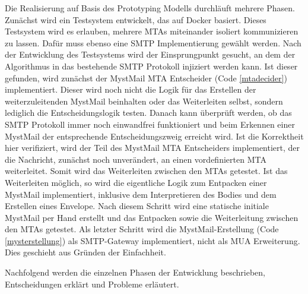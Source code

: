 Die Realisierung auf Basis des Prototyping Modells durchläuft mehrere Phasen. Zunächst wird ein Testsystem entwickelt, das auf Docker  basiert. Dieses Testsystem wird es erlauben, mehrere MTAs miteinander isoliert kommunizieren zu lassen. Dafür muss ebenso eine SMTP Implementierung gewählt werden. Nach der Entwicklung des Testsystems wird der Einsprungpunkt gesucht, an dem der Algorithmus in das bestehende SMTP Protokoll injiziert werden kann. Ist dieser gefunden, wird zunächst der MystMail MTA Entscheider (Code \ref{mtadecider}) implementiert. Dieser wird noch nicht die Logik für das Erstellen der weiterzuleitenden MystMail beinhalten oder das Weiterleiten selbst, sondern lediglich die Entscheidungslogik testen. Danach kann überprüft werden, ob das SMTP Protokoll immer noch einwandfrei funktioniert und beim Erkennen einer MystMail der entsprechende Entscheidungszweig erreicht wird. Ist die Korrektheit hier verifiziert, wird der Teil des MystMail MTA Entscheiders implementiert, der die Nachricht, zunächst noch unverändert, an einen vordefinierten MTA weiterleitet. Somit wird das Weiterleiten zwischen den MTAs getestet. Ist das Weiterleiten möglich, so wird die eigentliche Logik zum Entpacken einer MystMail implementiert, inklusive dem Interpretieren des Bodies und dem Erstellen eines Envelope. Nach diesem Schritt wird eine statische initiale MystMail per Hand erstellt und das Entpacken sowie die Weiterleitung zwischen den MTAs getestet. Als letzter Schritt wird die MystMail-Erstellung (Code \ref{mysterstellung}) als SMTP-Gateway implementiert, nicht als MUA Erweiterung. Dies geschieht aus Gründen der Einfachheit.

Nachfolgend werden die einzelnen Phasen der Entwicklung beschrieben, Entscheidungen erklärt und Probleme erläutert.

\label{section:realisierung}
